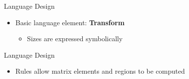 \documentclass[pdf,blends]{prosper}
\begin{document}
\begin{slide}{Language Design}
\begin{itemize}
\item Basic language element: {\bf Transform}
  \begin{itemize}
  \item Sizes are expressed symbolically
  \end{itemize}
\end{itemize}
\begin{center}
\end{center}
\end{slide}

\begin{slide}{Language Design}
  \begin{itemize}
  \item Rules allow matrix elements and regions to be computed
  \end{itemize}
\begin{center}
\end{center}
\end{slide}
\end{document}
